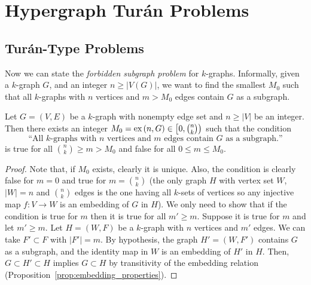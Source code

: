 \section{Hypergraph Turán Problems}\label{sec:extremal}

\subsection{Turán-Type Problems}\label{subsec:turan}

Now we can state the \emph{forbidden subgraph problem} for $k$-graphs.
Informally, given a $k$-graph $G$, and an integer $n \geq |V(G)|$,
we want to find the smallest $M_0$ such that all $k$-graphs with $n$ vertices and $m > M_0$ edges
contain $G$ as a subgraph.

\begin{proposition} \label{prop:extremal}
    Let $G = (V, E)$ be a $k$-graph with nonempty edge set and $n \geq |V|$ be an integer.
    Then there exists an integer $M_0 = \text{ex} \left( n, G \right) \in \left[ 0, \binom{n}{k}\right)$ such that
    the condition
    \[
        \text{``All $k$-graphs with $n$ vertices and $m$ edges contain $G$ as a subgraph.''}
    \]
    is true for all $\binom{n}{k} \geq m > M_0$ and false for all $0 \leq m \leq M_0$.

    \begin{proof}
        Note that, if $M_0$ exists, clearly it is unique.
        Also, the condition is clearly false for $m = 0$ and
        true for $m = \binom{n}{k}$
        (the only graph $H$ with vertex set $W$, $|W|=n$ and $\binom{n}{k}$ edges
        is the one having all $k$-sets of vertices so any injective map $f: V \to W$
        is an embedding of $G$ in $H$).
        We only need to show that if the condition is true for $m$ then it is true for
        all $m' \geq m$.
        Suppose it is true for $m$ and let $m' \geq m$.
        Let $H = (W, F)$ be a $k$-graph with $n$ vertices and $m'$ edges.
        We can take $F' \subset F$ with $|F'| = m$.
        By hypothesis, the graph $H' = (W, F')$ contains $G$ as a subgraph,
        and the identity map in $W$ is an embedding of $H'$ in $H$.
        Then, $G \subset H' \subset H$ implies $G \subset H$ by transitivity of the embedding
        relation (Proposition~\ref{prop:embedding_properties}).

    \end{proof}

\end{proposition}


